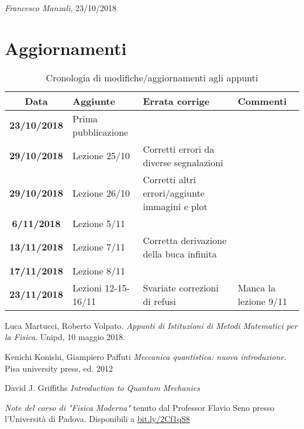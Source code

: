 \documentclass[12pt]{report}
\begin{document}
\begin{flushright}
\textit{Francesco Manzali}, 23/10/2018
\end{flushright}
\clearpage
\section*{Aggiornamenti}
\begin{table}[hb]
    \centering
    \begin{tabular}{|cm{3cm}m{5cm}m{3cm}|}\toprule
        Data & Aggiunte & Errata corrige & Commenti\\\midrule
        \textbf{23/10/2018} & Prima pubblicazione & & \\
        \textbf{29/10/2018} & Lezione 25/10 & Corretti errori da diverse segnalazioni & \\
        \textbf{29/10/2018} & Lezione 26/10 & Corretti altri errori/aggiunte immagini e plot & \\
        \textbf{6/11/2018} & Lezione 5/11 & &\\
        \textbf{13/11/2018} & Lezione 7/11 & Corretta derivazione della buca infinita &\\
        \textbf{17/11/2018} & Lezione 8/11 & &\\
        \textbf{23/11/2018} & Lezioni 12-15-16/11 & Svariate correzioni di refusi & Manca la lezione 9/11\\
        \bottomrule
    \end{tabular}
    \caption{Cronologia di modifiche/aggiornamenti agli appunti}
    \label{updates}
\end{table}

\clearpage






\clearpage
\begin{thebibliography}{9}

Luca Martucci, Roberto Volpato.
\textit{Appunti di Istituzioni di Metodi Matematici per la Fisica}. 
Unipd, 10 maggio 2018.
 
Kenichi Konishi, Giampiero Paffuti
\textit{Meccanica quantistica: nuova introduzione}.
Pisa university press, ed. 2012

David J. Griffiths
\textit{Introduction to Quantum Mechanics}

\textit{Note del corso di "Fisica Moderna"} tenuto dal Professor Flavio Seno presso l'Università di Padova.
Disponibili a \url{bit.ly/2Cf1qS8}
\end{thebibliography}

\printindex
\end{document}
